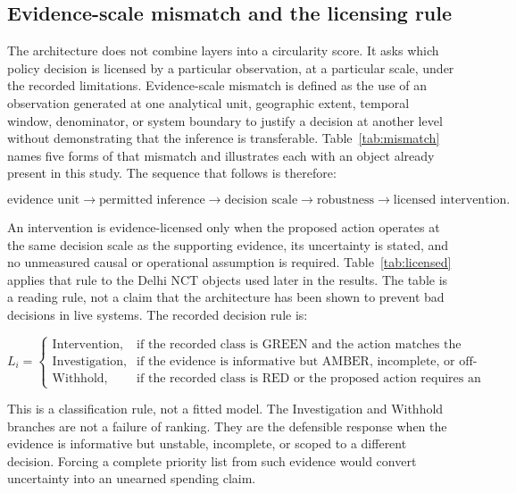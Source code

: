 \documentclass[12pt,a4paper]{article}
\begin{document}
\subsection{Evidence-scale mismatch and the licensing rule}

The architecture does not combine layers into a circularity score. It asks which policy decision is licensed by a particular observation, at a particular scale, under the recorded limitations. Evidence-scale mismatch is defined as the use of an observation generated at one analytical unit, geographic extent, temporal window, denominator, or system boundary to justify a decision at another level without demonstrating that the inference is transferable. Table~\ref{tab:mismatch} names five forms of that mismatch and illustrates each with an object already present in this study. The sequence that follows is therefore:

\[
\text{evidence unit}
\rightarrow
\text{permitted inference}
\rightarrow
\text{decision scale}
\rightarrow
\text{robustness}
\rightarrow
\text{licensed intervention.}
\]

An intervention is evidence-licensed only when the proposed action operates at the same decision scale as the supporting evidence, its uncertainty is stated, and no unmeasured causal or operational assumption is required. Table~\ref{tab:licensed} applies that rule to the Delhi NCT objects used later in the results. The table is a reading rule, not a claim that the architecture has been shown to prevent bad decisions in live systems. The recorded decision rule is:

\begin{equation}
L_i =
\begin{cases}
\text{Intervention}, & \text{if the recorded class is GREEN and the action matches the evidence scope}\\
\text{Investigation}, & \text{if the evidence is informative but AMBER, incomplete, or off-scope for spend}\\
\text{Withhold}, & \text{if the recorded class is RED or the proposed action requires an unmeasured transfer.}
\end{cases}
\end{equation}

This is a classification rule, not a fitted model. The Investigation and Withhold branches are not a failure of ranking. They are the defensible response when the evidence is informative but unstable, incomplete, or scoped to a different decision. Forcing a complete priority list from such evidence would convert uncertainty into an unearned spending claim.
\end{document}
